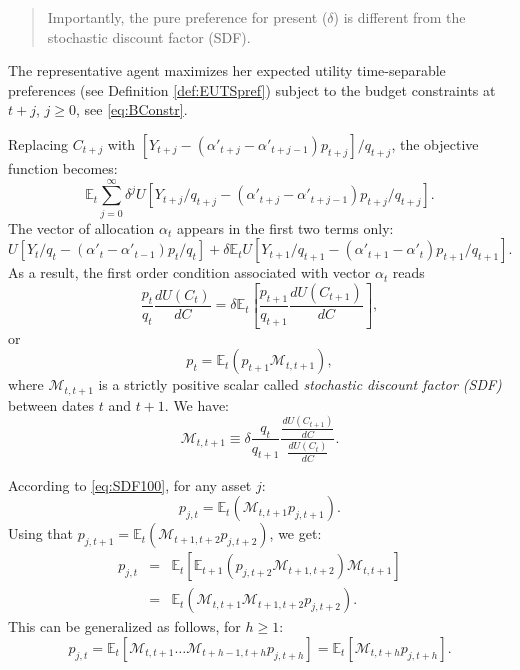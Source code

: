 \documentclass[
  12pt,
]{book}
\theoremstyle{definition}
\theoremstyle{definition}
\theoremstyle{definition}
\theoremstyle{definition}
\theoremstyle{remark}
\begin{document}
\begin{quote}
Importantly, the pure preference for present (\(\delta\)) is different from the stochastic discount factor (SDF).
\end{quote}

The representative agent maximizes her expected utility time-separable preferences (see Definition \ref{def:EUTSpref}) subject to the budget constraints at \(t+j\), \(j \ge 0\), see \eqref{eq:BConstr}.

Replacing \(C_{t+j}\) with \([Y_{t+j}-(\alpha'_{t+j}-\alpha'_{t+j-1})p_{t+j}]/q_{t+j}\), the objective function becomes:
\[
\mathbb{E}_t  \sum^\infty_{j=0} \delta^j U
[Y_{t+j}/q_{t+j}-(\alpha'_{t+j}-\alpha'_{t+j-1})p_{t+j}/q_{t+j}].
\]
The vector of allocation \(\alpha_t\) appears in the first two terms only:
\[
U[Y_t/q_t-(\alpha'_t-\alpha'_{t-1})p_t/q_t] + \delta \mathbb{E}_t
U[Y_{t+1}/q_{t+1}-(\alpha'_{t+1}-\alpha'_t)p_{t+1}/q_{t+1}].
\]
As a result, the first order condition associated with vector \(\alpha_t\) reads
\[
\frac{p_t}{q_t}  \frac{d U(C_t)}{dC} = \delta \mathbb{E}_t \left[
\frac{p_{t+1}}{q_{t+1}}  \frac{dU(C_{t+1})}{dC}
\right],
\]
or
\begin{equation}
p_t = \mathbb{E}_t(p_{t+1} \mathcal{M}_{t,t+1}),\label{eq:SDF100}
\end{equation}
where \(\mathcal{M}_{t,t+1}\) is a strictly positive scalar called \emph{stochastic discount factor (SDF)} between dates \(t\) and \(t+1\). We have:
\begin{equation}
\boxed{\mathcal{M}_{t,t+1} \equiv \delta  \frac{q_t}{q_{t+1}}
\frac{  \frac{dU(C_{t+1})}{dC}} {
\frac{dU(C_t)}{dC}}.}\label{eq:SDFCCAPM}
\end{equation}

According to \eqref{eq:SDF100}, for any asset \(j\):
\begin{equation}
p_{j,t} = \mathbb{E}_t(\mathcal{M}_{t,t+1} p_{j,t+1}).\label{eq:Mbasicpricing}
\end{equation}
Using that \(p_{j,t+1} = \mathbb{E}_t(\mathcal{M}_{t+1,t+2} p_{j,t+2})\), we get:
\begin{eqnarray*}
p_{j,t} &=& \mathbb{E}_t[\mathbb{E}_{t+1}(p_{j,t+2}\mathcal{M}_{t+1,t+2})\mathcal{M}_{t,t+1}] \\
&=& \mathbb{E}_t(\mathcal{M}_{t,t+1} \mathcal{M}_{t+1,t+2}p_{j,t+2}).
\end{eqnarray*}
This can be generalized as follows, for \(h \ge 1\):
\[
p_{j,t} = \mathbb{E}_t[\mathcal{M}_{t,t+1} \dots \mathcal{M}_{t+h-1,t+h}p_{j,t+h}] = \mathbb{E}_t[\mathcal{M}_{t,t+h}p_{j,t+h}].
\]
\end{document}
